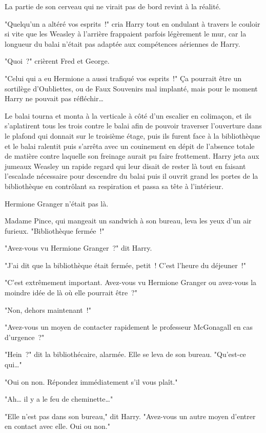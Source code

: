 La partie de son cerveau qui ne virait pas de bord revint à la réalité.

"Quelqu'un a altéré vos esprits~!" cria Harry tout en ondulant à travers le couloir si vite que les Weasley à l'arrière frappaient parfois légèrement le mur, car la longueur du balai n'était pas adaptée aux compétences aériennes de Harry.

"Quoi~?" crièrent Fred et George.

"Celui qui a eu Hermione a aussi trafiqué vos esprits~!" Ça pourrait être un sortilège d'Oubliettes, ou de Faux Souvenirs mal implanté, mais pour le moment Harry ne pouvait pas réfléchir…

Le balai tourna et monta à la verticale à côté d'un escalier en colimaçon, et ils s'aplatirent tous les trois contre le balai afin de pouvoir traverser l'ouverture dans le plafond qui donnait sur le troisième étage, puis ils furent face à la bibliothèque et le balai ralentit puis s'arrêta avec un couinement en dépit de l'absence totale de matière contre laquelle son freinage aurait pu faire frottement. Harry jeta aux jumeaux Weasley un rapide regard qui leur disait de rester là tout en faisant l'escalade nécessaire pour descendre du balai puis il ouvrit grand les portes de la bibliothèque en contrôlant sa respiration et passa sa tête à l'intérieur.

Hermione Granger n'était pas là.

Madame Pince, qui mangeait un sandwich à son bureau, leva les yeux d'un air furieux. "Bibliothèque fermée~!"

"Avez-vous vu Hermione Granger~?" dit Harry.

"J'ai dit que la bibliothèque était fermée, petit~! C'est l'heure du déjeuner~!"

"C'est extrêmement important. Avez-vous vu Hermione Granger ou avez-vous la moindre idée de là où elle pourrait être~?"

"Non, dehors maintenant~!"

"Avez-vous un moyen de contacter rapidement le professeur McGonagall en cas d'urgence~?"

"Hein~?" dit la bibliothécaire, alarmée. Elle se leva de son bureau. "Qu'est-ce qui…"

"Oui on non. Répondez immédiatement s'il vous plaît."

"Ah… il y a le feu de cheminette…"

"Elle n'est pas dans son bureau," dit Harry. "Avez-vous un autre moyen d'entrer en contact avec elle. Oui ou non."

